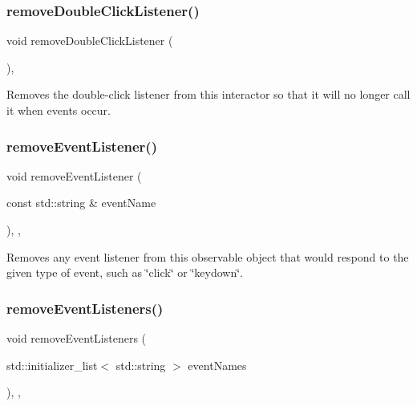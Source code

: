 \subsubsection{\texorpdfstring{remove\+Double\+Click\+Listener()}{removeDoubleClickListener()}}
{\footnotesize\ttfamily void remove\+Double\+Click\+Listener (\begin{DoxyParamCaption}{ }\end{DoxyParamCaption})\hspace{0.3cm}{\ttfamily [virtual]}, {\ttfamily [inherited]}}



Removes the double-\/click listener from this interactor so that it will no longer call it when events occur. 

\mbox{\label{classsgl_1_1GObservable_acbcf1ed3a851ad8a3c17ef38d86b481d}} 
\subsubsection{\texorpdfstring{remove\+Event\+Listener()}{removeEventListener()}}
{\footnotesize\ttfamily void remove\+Event\+Listener (\begin{DoxyParamCaption}\item[{const std\+::string \&}]{event\+Name }\end{DoxyParamCaption})\hspace{0.3cm}{\ttfamily [protected]}, {\ttfamily [virtual]}, {\ttfamily [inherited]}}



Removes any event listener from this observable object that would respond to the given type of event, such as \char`\"{}click\char`\"{} or \char`\"{}keydown\char`\"{}. 

\mbox{\label{classsgl_1_1GObservable_af51cc35c29a1bd1908609d432decdbb6}} 
\subsubsection{\texorpdfstring{remove\+Event\+Listeners()}{removeEventListeners()}}
{\footnotesize\ttfamily void remove\+Event\+Listeners (\begin{DoxyParamCaption}\item[{std\+::initializer\+\_\+list$<$ std\+::string $>$}]{event\+Names }\end{DoxyParamCaption})\hspace{0.3cm}{\ttfamily [protected]}, {\ttfamily [virtual]}, {\ttfamily [inherited]}}



